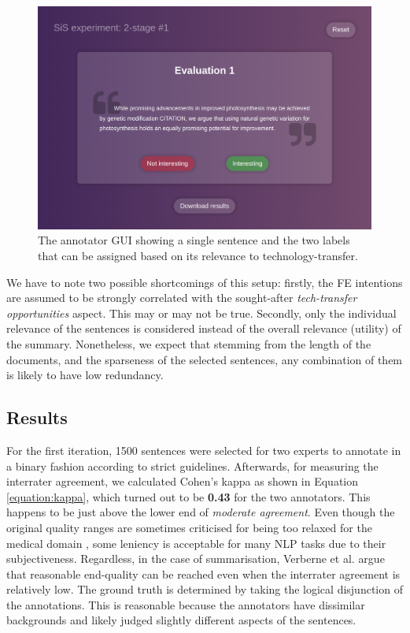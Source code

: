 \begin{figure}[h]
    \centering
    \includegraphics[width=0.75\linewidth]{figures/annotator.png}
    \captionsetup{width=.9\linewidth}
    \caption{The annotator GUI showing a single sentence and the two labels that can be assigned based on its relevance to technology-transfer.}
    \label{fig:annotator}
\end{figure}

We have to note two possible shortcomings of this setup: firstly, the FE intentions are assumed to be strongly correlated with the sought-after \textit{tech-transfer opportunities} aspect. This may or may not be true. Secondly, only the individual relevance of the sentences is considered instead of the overall relevance (utility) of the summary. Nonetheless, we expect that stemming from the length of the documents, and the sparseness of the selected sentences, any combination of them is likely to have low redundancy.

\subsection{Results}

For the first iteration, 1500 sentences were selected for two experts to annotate in a binary fashion according to strict guidelines. Afterwards, for measuring the interrater agreement, we calculated Cohen's kappa \cite{cohen1960coefficient} as shown in Equation \ref{equation:kappa}, which turned out to be \textbf{0.43} for the two annotators. This happens to be just above the lower end of \textit{moderate agreement}. Even though the original quality ranges are sometimes criticised for being too relaxed for the medical domain \cite{mchugh2012interrater}, some leniency is acceptable for many NLP tasks due to their subjectiveness. Regardless, in the case of summarisation, Verberne et al. \cite{verberne2018creating} argue that reasonable end-quality can be reached even when the interrater agreement is relatively low. The ground truth is determined by taking the logical disjunction of the annotations. This is reasonable because the annotators have dissimilar backgrounds and likely judged slightly different aspects of the sentences.


